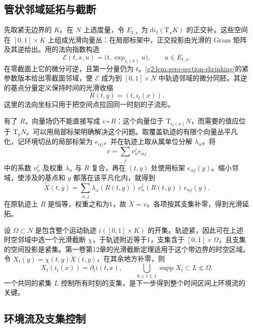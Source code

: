 \subsection{管状邻域延拓与截断}
\label{g2:subsec:1505:02}

先取紧无边界的 \(K\)。在 \(N\) 上选度量，令 \(E_{t,x}\) 为 \(\mathrm{d}i_t(\mathrm{T}_xK)\) 的正交补。这些空间在 \([0,1]\times K\) 上组成光滑向量丛：在局部标架中，正交投影由光滑的 Gram 矩阵及其逆给出。用的法向指数构造
\[
	\mathcal E(t,x,u)=\bigl(t,\exp_{i_t(x)}u\bigr),\qquad u\in E_{t,x}.
\]
在零截面上它的微分可逆，且第一分量仍为 \(t\)。\cref{g2:lem:zero-section-shrinking}的紧参数版本给出零截面邻域，使 \(\mathcal E\) 成为到 \([0,1]\times N\) 中轨迹邻域的微分同胚。其逆的基点分量定义保持时间的光滑收缩
\[
	R(t,y)=(t,i_t(x)).
\]
这里的法向坐标只用于把空间点拉回同一时刻的子流形。

\ProseParagraphBreak

有了 \(R\)，向量场仍不能直接写成 \(v\circ R\)：这个向量位于 \(\mathrm{T}_{i_t(x)}N\)，而需要的值应位于 \(\mathrm{T}_yN\)。可以用局部标架明确解决这个问题。取覆盖轨迹的有限个向量丛平凡化，记环境切丛的局部标架为 \(e_{\alpha j}\)，并在轨迹上取从属单位分解 \(\lambda_\alpha\)。将
\[
	v=\sum_j v_\alpha^j e_{\alpha j}
\]
中的系数 \(v_\alpha^j\) 及权重 \(\lambda_\alpha\) 与 \(R\) 复合，再在 \((t,y)\) 处使用标架 \(e_{\alpha j}(y)\)。缩小邻域，使涉及的基点和 \(y\) 都落在该平凡化内，就得到
\[
	\widetilde X(t,y)=\sum_{\alpha,j}\lambda_\alpha(R(t,y))\,
	v_\alpha^j(R(t,y))\,e_{\alpha j}(y).
\]
在原轨迹上 \(R\) 是恒等，权重之和为1，故 \(\widetilde X=v\)。各项按其支集补零，得到光滑延拓。

\ProseParagraphBreak

设 \(\Omega\subset N\) 是包含整个运动轨迹 \(i([0,1]\times K)\) 的开集。轨迹紧，因此可在上述时空邻域中选一个光滑截断 \(\chi\)，于轨迹附近等于1，支集含于 \([0,1]\times\Omega\)，且支集的空间投影是紧集。第一卷第12章的光滑截断定理适用于这个带边界的时空区域。令 \(X_t(y)=\chi(t,y)\widetilde X(t,y)\)，在其余地方补零，则
\[
	X_t(i_t(x))=\partial_ti(t,x),\qquad
	\bigcup_{0\le t\le1}\operatorname{supp}X_t\subset L\Subset\Omega.
\]
一个共同的紧集 \(L\) 控制所有时刻的支集，是下一步得到整个时间区间上环境流的关键。

\subsection{环境流及支集控制}
\label{g2:subsec:1505:03}

